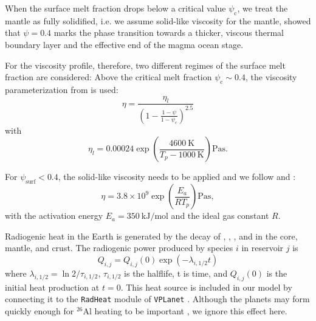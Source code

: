 \documentclass[oneside,twocolumn]{article}
\newcommand{\vplanet}{\texttt{\footnotesize{VPLanet}}}
\newcommand{\radheat}{\texttt{\footnotesize{RadHeat}}}
\begin{document}
When the surface melt fraction drops below a critical value $\psi_\mathrm{c}$, we treat the mantle as fully solidified, i.e. we assume solid-like viscosity for the mantle, 
\citet{Lebrun2013} showed that $\psi = 0.4$ marks the phase transition towards a thicker, viscous thermal boundary layer and the effective end of the magma ocean stage. 

For the viscosity profile, therefore, two different regimes of the surface melt fraction are considered:
Above the critical melt fraction $\psi_\mathrm{c} \sim 0.4$, the viscosity parameterization from \citet{Lebrun2013} is used:
\begin{equation}
\label{eta_liq}
\eta = \frac{\eta_l}{\left( 1 - \frac{1-\psi}{1-\psi_\mathrm{c}}\right)^{2.5}}
\end{equation}
with
\begin{equation}
\eta_l = 0.00024 \exp \left( \frac{\SI{4600}{\kelvin}}{T_p - \SI{1000}{\kelvin}} \right) \si{\pascal\second}.
\end{equation}

For $\psi_\mathrm{surf} < 0.4$, the solid-like viscosity needs to be applied and we follow \citet{Lebrun2013} and \citet{Schaefer2016}:
\begin{equation}
\eta = 3.8 \times 10^9 \exp \left( \frac{E_a}{R T_p} \right) \si{\pascal\second},
\end{equation}
with the activation energy $E_a = \SI{350}{\kilo\joule\per\mole}$ and the ideal gas constant $R$.

Radiogenic heat in the Earth is generated by the decay of , , , and  in the core, mantle, and crust.
The radiogenic power produced by species $i$ in reservoir $j$ is
\begin{equation}
	Q_{i,j}=Q_{i,j}(0)\exp(-\lambda_{i,1/2}t)
	\label{radiogenicheat}
\end{equation}
where $\lambda_{i,1/2}=\ln 2/\tau_{i,1/2}$, $\tau_{i,1/2}$ is the halflife, t is time, and $Q_{i,j}(0)$ is the initial heat production at $t=0$.
This heat source is included in our model by connecting it to the \radheat{} module of \vplanet{} \citep{Barnes2020}. Although the planets may form quickly enough for $^{26}$Al heating to be important \citep{Barnes2016,Lichtenberg2019}, we ignore this effect here.
\end{document}
